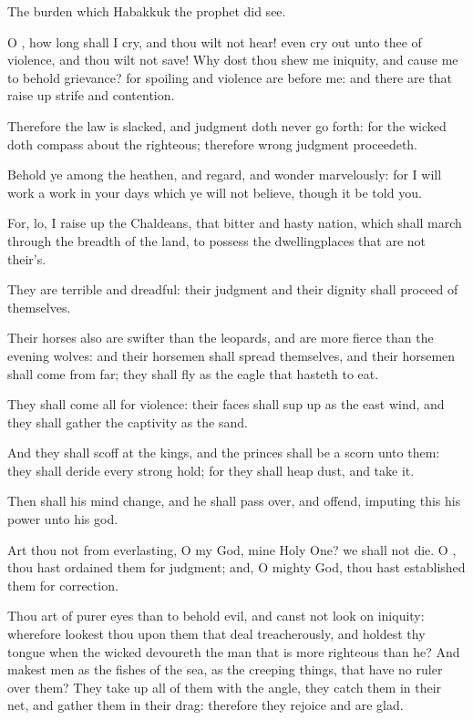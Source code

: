 \Chapter
\Verse The burden which Habakkuk the prophet did see.

\Verse O \LORD, how long shall I cry, and thou wilt not hear! even cry out unto thee of violence, and thou wilt not save!  \Verse Why dost thou shew me iniquity, and cause me to behold grievance? for spoiling and violence are before me: and there are that raise up strife and contention.

\Verse Therefore the law is slacked, and judgment doth never go forth: for the wicked doth compass about the righteous; therefore wrong judgment proceedeth.

\Verse Behold ye among the heathen, and regard, and wonder marvelously: for I will work a work in your days which ye will not believe, though it be told you.

\Verse For, lo, I raise up the Chaldeans, that bitter and hasty nation, which shall march through the breadth of the land, to possess the dwellingplaces that are not their's.

\Verse They are terrible and dreadful: their judgment and their dignity shall proceed of themselves.

\Verse Their horses also are swifter than the leopards, and are more fierce than the evening wolves: and their horsemen shall spread themselves, and their horsemen shall come from far; they shall fly as the eagle that hasteth to eat.

\Verse They shall come all for violence: their faces shall sup up as the east wind, and they shall gather the captivity as the sand.

\Verse And they shall scoff at the kings, and the princes shall be a scorn unto them: they shall deride every strong hold; for they shall heap dust, and take it.

\Verse Then shall his mind change, and he shall pass over, and offend, imputing this his power unto his god.

\Verse Art thou not from everlasting, O \LORD my God, mine Holy One? we shall not die. O \LORD, thou hast ordained them for judgment; and, O mighty God, thou hast established them for correction.

\Verse Thou art of purer eyes than to behold evil, and canst not look on iniquity: wherefore lookest thou upon them that deal treacherously, and holdest thy tongue when the wicked devoureth the man that is more righteous than he?  \Verse And makest men as the fishes of the sea, as the creeping things, that have no ruler over them?  \Verse They take up all of them with the angle, they catch them in their net, and gather them in their drag: therefore they rejoice and are glad.


